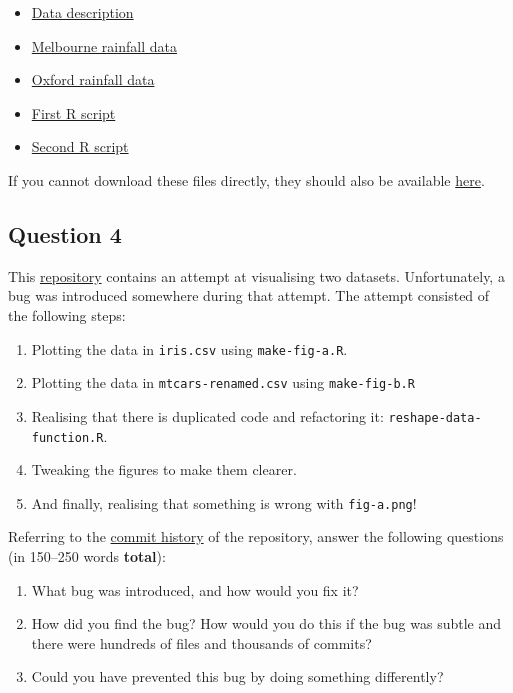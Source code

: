 \documentclass[11pt,onecolumn]{scrartcl}
\begin{document}
\begin{itemize}
\item \href{./homework-question-3/data-sources.txt}{Data description}
\item \href{./homework-question-3/melbourne.csv}{Melbourne rainfall data}
\item \href{./homework-question-3/oxford.txt}{Oxford rainfall data}
\item \href{./homework-question-3/combine-data.R}{First R script}
\item \href{./homework-question-3/make-plot.R}{Second R script}
\end{itemize}

If you cannot download these files directly, they should also be available \href{https://github.com/aezarebski/github-tutorial/tree/main/homework-question-3}{here}.

\subsection{Question 4}
\label{sec:orgbf11578}

This \href{https://github.com/aezarebski/biology-github-tutorial}{repository} contains an attempt at visualising two datasets. Unfortunately,
a bug was introduced somewhere during that attempt. The attempt consisted of the
following steps:

\begin{enumerate}
\item Plotting the data in \texttt{iris.csv} using \texttt{make-fig-a.R}.
\item Plotting the data in \texttt{mtcars-renamed.csv} using \texttt{make-fig-b.R}
\item Realising that there is duplicated code and refactoring it:
\texttt{reshape-data-function.R}.
\item Tweaking the figures to make them clearer.
\item And finally, realising that something is wrong with \texttt{fig-a.png}!
\end{enumerate}

Referring to the \href{https://github.com/aezarebski/biology-github-tutorial/commits/main}{commit history} of the repository, answer the following
questions (in 150--250 words \textbf{total}):

\begin{enumerate}
\item What bug was introduced, and how would you fix it?
\item How did you find the bug? How would you do this if the bug was subtle and
there were hundreds of files and thousands of commits?
\item Could you have prevented this bug by doing something differently?
\end{enumerate}
\end{document}
